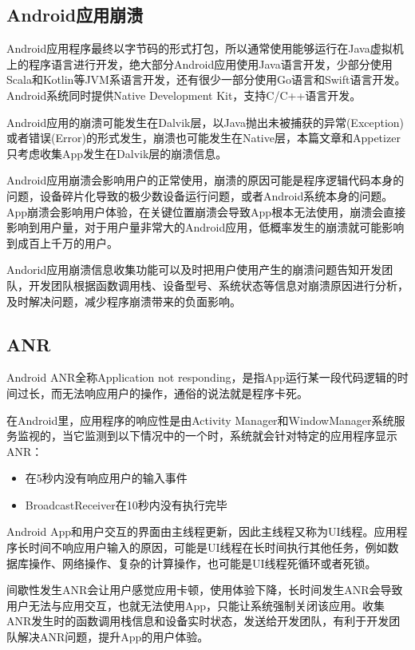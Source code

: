 \subsection{Android应用崩溃}

Android应用程序最终以字节码的形式打包，所以通常使用能够运行在Java虚拟机上的程序语言进行开发，绝大部分Android应用使用Java语言开发，少部分使用Scala和Kotlin等JVM系语言开发，还有很少一部分使用Go语言和Swift语言开发。Android系统同时提供Native Development Kit，支持C/C++语言开发。

Android应用的崩溃可能发生在Dalvik层，以Java抛出未被捕获的异常(Exception)或者错误(Error)的形式发生，崩溃也可能发生在Native层，本篇文章和Appetizer只考虑收集App发生在Dalvik层的崩溃信息。

Android应用崩溃会影响用户的正常使用，崩溃的原因可能是程序逻辑代码本身的问题，设备碎片化导致的极少数设备运行问题，或者Android系统本身的问题。App崩溃会影响用户体验，在关键位置崩溃会导致App根本无法使用，崩溃会直接影响到用户量，对于用户量非常大的Android应用，低概率发生的崩溃就可能影响到成百上千万的用户。

Andorid应用崩溃信息收集功能可以及时把用户使用产生的崩溃问题告知开发团队，开发团队根据函数调用栈、设备型号、系统状态等信息对崩溃原因进行分析，及时解决问题，减少程序崩溃带来的负面影响。

\subsection{ANR}
\label{subsec:background_ANR}

Android ANR全称Application not responding，是指App运行某一段代码逻辑的时间过长，而无法响应用户的操作，通俗的说法就是程序卡死。

 在Android里，应用程序的响应性是由Activity Manager和WindowManager系统服务监视的，当它监测到以下情况中的一个时，系统就会针对特定的应用程序显示ANR：
 
 \begin{itemize}
 	\item 在5秒内没有响应用户的输入事件
 	\item BroadcastReceiver在10秒内没有执行完毕
 \end{itemize}

Android App和用户交互的界面由主线程更新，因此主线程又称为UI线程。应用程序长时间不响应用户输入的原因，可能是UI线程在长时间执行其他任务，例如数据库操作、网络操作、复杂的计算操作，也可能是UI线程死循环或者死锁。

间歇性发生ANR会让用户感觉应用卡顿，使用体验下降，长时间发生ANR会导致用户无法与应用交互，也就无法使用App，只能让系统强制关闭该应用。收集ANR发生时的函数调用栈信息和设备实时状态，发送给开发团队，有利于开发团队解决ANR问题，提升App的用户体验。

